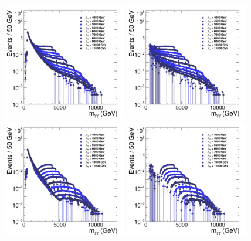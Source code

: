 \begin{figure}[tbp!]
\begin{center}
\includegraphics[angle=0,width=0.48\textwidth]{fig/ADDGravToGG_NED-2017_KK-1-1.png}
\includegraphics[angle=0,width=0.48\textwidth]{fig/ADDGravToGG_NED-2017_KK-1_bkg_sub-1.png}
\includegraphics[angle=0,width=0.48\textwidth]{fig/ADDGravToGG_NED-2017_KK-0-1.png}
\includegraphics[angle=0,width=0.48\textwidth]{fig/ADDGravToGG_NED-2017_KK-0_bkg_sub-1.png}

\end{center}
\end{figure}
